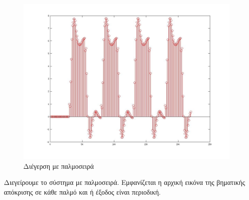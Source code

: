 \documentclass[a4paper,10pt]{article} \usepackage{anysize}
\begin{document}
\begin{figure}[H]
\caption{Διέγερση με παλμοσειρά}
\centering
	\includegraphics[scale=0.4]{files/25-diegersh_me_palmoseira.jpg}
\end{figure}
Διεγείρουμε το σύστημα με παλμοσειρά. Εμφανίζεται η αρχική εικόνα της
βηματικής απόκρισης σε κάθε παλμό και ή έξοδος είναι περιοδική.
\end{document}

